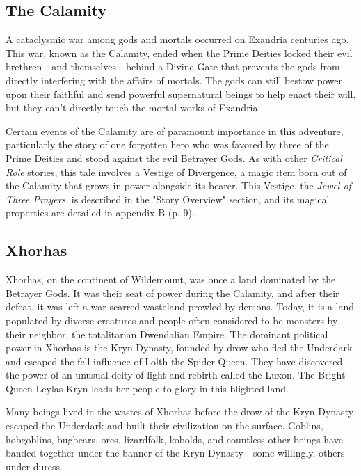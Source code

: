 \documentclass[letterpaper, 11pt, bg=full, twocolumn]{dndbook}
\begin{document}
\subsection{The Calamity}

A cataclysmic war among gods and mortals occurred on Exandria centuries ago. This war, known as the Calamity, ended when the Prime Deities locked their evil brethren---and themselves---behind a Divine Gate that prevents the gods from directly interfering with the affairs of mortals. The gods can still bestow power upon their faithful and send powerful supernatural beings to help enact their will, but they can't directly touch the mortal works of Exandria.

Certain events of the Calamity are of paramount importance in this adventure, particularly the story of one forgotten hero who was favored by three of the Prime Deities and stood against the evil Betrayer Gods. As with other \textit{Critical Role} stories, this tale involves a Vestige of Divergence, a magic item born out of the Calamity that grows in power alongside its bearer. This Vestige, the \textit{Jewel of Three Prayers}, is described in the "Story Overview" section, and its magical properties are detailed in appendix B (p. 9).

\subsection{Xhorhas}

Xhorhas, on the continent of Wildemount, was once a land dominated by the Betrayer Gods. It was their seat of power during the Calamity, and after their defeat, it was left a war-scarred wasteland prowled by demons. Today, it is a land populated by diverse creatures and people often considered to be monsters by their neighbor, the totalitarian Dwendalian Empire. The dominant political power in Xhorhas is the Kryn Dynasty, founded by drow who fled the Underdark and escaped the fell influence of Lolth the Spider Queen. They have discovered the power of an unusual deity of light and rebirth called the Luxon. The Bright Queen Leylas Kryn leads her people to glory in this blighted land.

Many beings lived in the wastes of Xhorhas before the drow of the Kryn Dynasty escaped the Underdark and built their civilization on the surface. Goblins, hobgoblins, bugbears, orcs, lizardfolk, kobolds, and countless other beings have banded together under the banner of the Kryn Dynasty---some willingly, others under duress.
\end{document}
